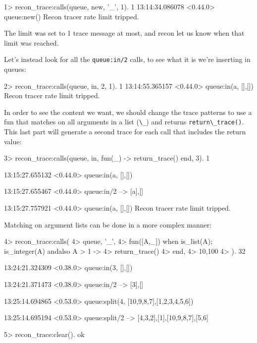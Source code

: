\documentclass[11pt, oneside]{book}   	%
\newcommand{\function}[1]{\Verb`#1`}
\newcommand{\expression}[1]{\Verb`#1`}
\newcommand{\term}[1]{\Verb`#1`}
\begin{document}
\begin{VerbatimEshell}
1> recon_trace:calls({queue, new, '_'}, 1).
1
13:14:34.086078 <0.44.0> queue:new()
Recon tracer rate limit tripped.
\end{VerbatimEshell}

The limit was set to 1 trace message at most, and recon let us know when that limit was reached.

Let's instead look for all the \function{queue:in/2} calls, to see what it is we're inserting in queues:

\begin{VerbatimEshell}
2> recon_trace:calls({queue, in, 2}, 1).
1
13:14:55.365157 <0.44.0> queue:in(a, {[],[]})
Recon tracer rate limit tripped.
\end{VerbatimEshell}

In order to see the content we want, we should change the trace patterns to use a fun that matches on all arguments in a list (\term{\_}) and returns \expression{return\_trace()}. This last part will generate a second trace for each call that includes the return value:

\begin{VerbatimEshell}
3> recon_trace:calls({queue, in, fun(_) -> return_trace() end}, 3).
1

13:15:27.655132 <0.44.0> queue:in(a, {[],[]})

13:15:27.655467 <0.44.0> queue:in/2 --> {[a],[]}

13:15:27.757921 <0.44.0> queue:in(a, {[],[]})
Recon tracer rate limit tripped.
\end{VerbatimEshell}

Matching on argument lists can be done in a more complex manner:

\begin{VerbatimEshell}
4> recon_trace:calls(
4>   {queue, '_',
4>    fun([A,_]) when is_list(A); is_integer(A) andalso A > 1 ->
4>        return_trace()
4>    end},
4>   {10,100}
4> ).
32

13:24:21.324309 <0.38.0> queue:in(3, {[],[]})

13:24:21.371473 <0.38.0> queue:in/2 --> {[3],[]}

13:25:14.694865 <0.53.0> queue:split(4, {[10,9,8,7],[1,2,3,4,5,6]})

13:25:14.695194 <0.53.0> queue:split/2 --> {{[4,3,2],[1]},{[10,9,8,7],[5,6]}}

5> recon_trace:clear().
ok
\end{VerbatimEshell}
\end{document}
